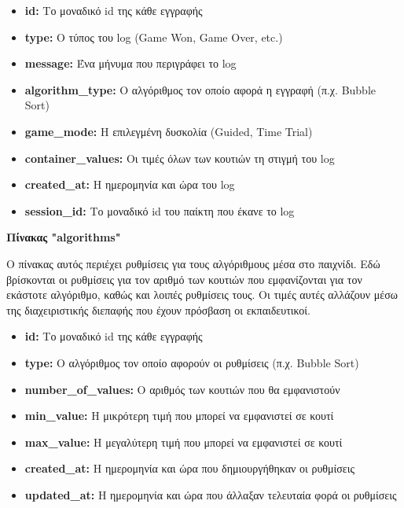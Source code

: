 \begin{itemize}
    \item \textbf{id:} Το μοναδικό id της κάθε εγγραφής
    \item \textbf{type:} Ο τύπος του log (Game Won, Game Over, etc.)
    \item \textbf{message:} Ένα μήνυμα που περιγράφει το log
    \item \textbf{algorithm\_type:} Ο αλγόριθμος τον οποίο αφορά η εγγραφή (π.χ. Bubble Sort)
    \item \textbf{game\_mode:} Η επιλεγμένη δυσκολία (Guided, Time Trial)
    \item \textbf{container\_values:} Οι τιμές όλων των κουτιών τη στιγμή του log
    \item \textbf{created\_at:} Η ημερομηνία και ώρα του log
    \item \textbf{session\_id:} Το μοναδικό id του παίκτη που έκανε το log
\end{itemize}


\vspace{5mm}
\textbf{Πίνακας "algorithms"}

Ο πίνακας αυτός περιέχει ρυθμίσεις για τους αλγόριθμους μέσα στο παιχνίδι. Εδώ βρίσκονται οι ρυθμίσεις για τον αριθμό των κουτιών που εμφανίζονται για τον εκάστοτε αλγόριθμο, καθώς και λοιπές ρυθμίσεις τους. Οι τιμές αυτές αλλάζουν μέσω της διαχειριστικής διεπαφής που έχουν πρόσβαση οι εκπαιδευτικοί.

\begin{itemize}
    \item \textbf{id:} Το μοναδικό id της κάθε εγγραφής
    \item \textbf{type:} Ο αλγόριθμος τον οποίο αφορούν οι ρυθμίσεις (π.χ. Bubble Sort)
    \item \textbf{number\_of\_values:} Ο αριθμός των κουτιών που θα εμφανιστούν
    \item \textbf{min\_value:} Η μικρότερη τιμή που μπορεί να εμφανιστεί σε κουτί
    \item \textbf{max\_value:} Η μεγαλύτερη τιμή που μπορεί να εμφανιστεί σε κουτί
    \item \textbf{created\_at:} Η ημερομηνία και ώρα που δημιουργήθηκαν οι ρυθμίσεις
    \item \textbf{updated\_at:} Η ημερομηνία και ώρα που άλλαξαν τελευταία φορά οι ρυθμίσεις
\end{itemize}


